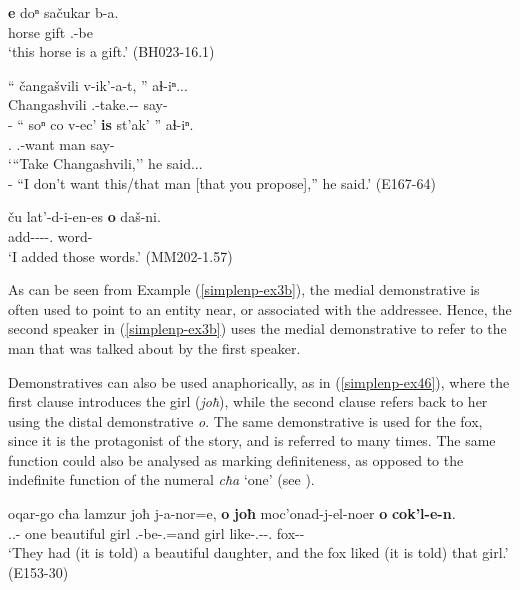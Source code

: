 \begin{exe}
	\ex\label{simplenp-ex3} \begin{xlist}
		\ex\label{simplenp-ex3a}
		\gll \textbf{e} doⁿ sačukar b-a. \\
		\textbf{{\Prox}} horse gift {\B}.{\Sg}-be \\
		\trans `this horse is a gift.'
		\hfill (BH023-16.1)
		
		\ex\label{simplenp-ex3b}
		\gll `` čangašvili v-ik'-a-t, '' aɬ-iⁿ...  \\
		{} Changashvili {\M}.{\Sg}-take.{\Anim}-{\Imp}-{\Pl} {} say-{\Aor}  \\
        
		\gll - `` soⁿ co v-ec' \textbf{is} st'ak' '' aɬ-iⁿ.\\
		{} {} {\Fsg}.{\Dat} {\Neg} {\M}.{\Sg}-want \textbf{{\Med}} man {} say-{\Aor} \\
		
        \trans `{``}Take Changashvili,'' he said... \\
		- ``I don't want this/that man [that you propose],'' he said.'
		\hfill (E167-64)
		
		\ex\label{simplenp-ex3c}
		\gll ču lat'-d-i-en-es \textbf{o} daš-ni. \\
		{\Pv} add-{\D}-{\Tr}-{\Aor}-{\Fsg}.{\Erg} \textbf{{\Dist}} word-{\Pl} \\
		\trans `I added those words.' 
		\hfill (MM202-1.57)
		
	\end{xlist}
\end{exe}

As can be seen from Example (\ref{simplenp-ex3b}), the medial demonstrative is often used to point to an entity near, or associated with the addressee. Hence, the second speaker in (\ref{simplenp-ex3b}) uses the medial demonstrative to refer to the man that was talked about by the first speaker.

Demonstratives can also be used anaphorically, as in  (\ref{simplenp-ex46}), where the first clause introduces the girl (\textit{joħ}), while the second clause refers back to her using the distal demonstrative \textit{o}. The same demonstrative is used for the fox, since it is the protagonist of the story, and is referred to many times. The same function could also be analysed as marking definiteness, as opposed to the indefinite function of the numeral \textit{cħa} `one' (see ).

\begin{exe}
	\ex\label{simplenp-ex46}
	
	\gll oqar-go cħa lamzur joħ j-a-nor=e, \textbf{o} \textbf{joħ} moc'onad-j-el-noer \textbf{o} \textbf{cok'l-e-n}. \\
	{\Dist}.{\Pl}.{\Obl}-{\Adess} one beautiful girl {\F}.{\Sg}-be-{\Nw}.{\Rem}=and {\Dist} girl like-{\F}.{\Sg}-{\Intr}-{\Nw}.{\Rem} {\Dist} fox-{\Obl}-{\Dat} \\
	\trans `They had (it is told) a beautiful daughter, and the fox liked (it is told) that girl.' 
	\hfill (E153-30)
	
\end{exe}

